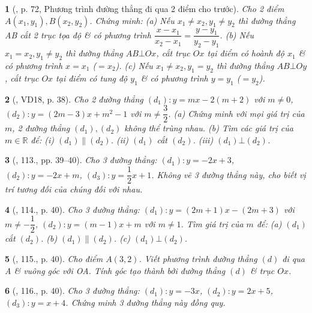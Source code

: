 \documentclass{article}
\newtheorem{baitoan}{}
\begin{document}
\begin{baitoan}[\cite{Binh_boi_duong_Toan_9_tap_1}, p. 72, Phương trình đường thẳng đi qua 2 điểm cho trước]
	Cho 2 điểm $A(x_1,y_1),B(x_2,y_2)$. Chứng minh: (a) Nếu $x_1\ne x_2,y_1\ne y_2$ thì đường thẳng AB cắt 2 trục tọa độ \& có phương trình $\dfrac{x - x_1}{x_2 - x_1} = \dfrac{y - y_1}{y_2 - y_1}$. (b) Nếu $x_1 = x_2,y_1\ne y_2$ thì đường thẳng $AB\bot Ox$, cắt trục $Ox$ tại điểm có hoành độ $x_1$ \& có phương trình $x = x_1$ ($= x_2$). (c) Nếu $x_1\ne x_2,y_1 = y_2$ thì đường thẳng $AB\bot Oy$, cắt trục $Ox$ tại điểm có tung độ $y_1$ \& có phương trình $y = y_1$ ($= y_2$).
\end{baitoan}

\begin{baitoan}[\cite{Tuyen_Toan_9_old}, VD18, p. 38]
	Cho 2 đường thẳng $(d_1):y = mx - 2(m + 2)$ với $m\ne0$, $(d_2):y = (2m - 3)x + m^2 - 1$ với $m\ne\dfrac{3}{2}$. (a) Chứng minh với mọi giá trị của $m$, 2 đường thẳng $(d_1),(d_2)$ không thể trùng nhau. (b) Tìm các giá trị của $m\in\mathbb{R}$ để: (i) $(d_1)\parallel(d_2)$. (ii) $(d_1)$ cắt $(d_2)$. (iii) $(d_1)\bot(d_2)$.
\end{baitoan}

\begin{baitoan}[\cite{Tuyen_Toan_9_old}, 113., pp. 39--40]
	Cho 3 đường thẳng: $(d_1):y = -2x + 3$, $(d_2):y = -2x + m$, $(d_3):y = \dfrac{1}{2}x + 1$. Không vẽ 3 đường thẳng này, cho biết vị trí tương đối của chúng đối với nhau.
\end{baitoan}

\begin{baitoan}[\cite{Tuyen_Toan_9_old}, 114., p. 40]
	Cho 3 đường thẳng: $(d_1):y = (2m + 1)x - (2m + 3)$ với $m\ne-\dfrac{1}{2}$, $(d_2):y = (m - 1)x + m$ với $m\ne1$. Tìm giá trị của $m$ để: (a) $(d_1)$ cắt $(d_2)$. (b) $(d_1)\parallel(d_2)$. (c) $(d_1)\bot(d_2)$.
\end{baitoan}

\begin{baitoan}[\cite{Tuyen_Toan_9_old}, 115., p. 40]
	Cho điểm $A(3,2)$. Viết phương trình đường thẳng $(d)$ đi qua A \& vuông góc với OA. Tính góc tạo thành bởi đường thẳng $(d)$ \& trục $Ox$.
\end{baitoan}

\begin{baitoan}[\cite{Tuyen_Toan_9_old}, 116., p. 40]
	Cho 3 đường thẳng: $(d_1):y = -3x$, $(d_2):y = 2x + 5$, $(d_3):y = x + 4$. Chứng minh 3 đường thẳng này đồng quy.
\end{baitoan}
\end{document}
